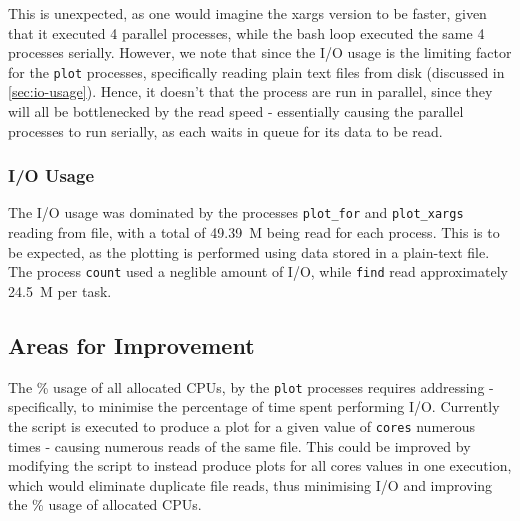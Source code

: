 \documentclass{article}
\begin{document}
This is unexpected, as one would imagine the xargs version to be faster, given
that it executed 4 parallel processes, while the bash loop executed the same 4
processes serially.
However, we note that since the I/O usage is the limiting factor for the
\lstinline{plot} processes, specifically reading plain text files from disk
(discussed in \autoref{sec:io-usage}).
Hence, it doesn't that the process are run in parallel, since they will all be
bottlenecked by the read speed - essentially causing the parallel processes to
run serially, as each waits in queue for its data to be read.

\subsubsection{I/O Usage}
\label{sec:io-usage}

The I/O usage was dominated by the processes \lstinline{plot_for} and
\lstinline{plot_xargs} reading from file, with a total of \SI{49.39}{M} being
read for each process.
This is to be expected, as the plotting is performed using data stored in a
plain-text file.
The process \lstinline{count} used a neglible amount of I/O, while
\lstinline{find} read approximately \SI{24.5}{M} per task.

\subsection{Areas for Improvement}
\label{sec:areas-improvement}

The \% usage of all allocated CPUs, by the \lstinline{plot} processes requires
addressing - specifically, to minimise the percentage of time spent performing
I/O.
Currently the script  is executed to produce a plot
for a given value of \lstinline{cores} numerous times - causing numerous reads
of the same file.
This could be improved by modifying the script to instead produce plots for all
cores values in one execution, which would eliminate duplicate file reads, thus
minimising I/O and improving the \% usage of allocated CPUs.
\end{document}
